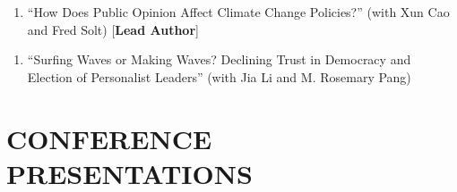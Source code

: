 \documentclass[10.5pt,]{article}
\providecommand{\tightlist}{%
	\setlength{\itemsep}{0pt}\setlength{\parskip}{0pt}}
\renewenvironment{itemize}{
	\begin{list}{}{
			\setlength{\leftmargin}{1.5em}
		}
	}{
	\end{list}
}
\begin{document}
\begin{itemize}
  \begin{itemize}
  \tightlist
  \item
    \begin{enumerate}
    \def\labelenumi{\arabic{enumi}.}
    \setcounter{enumi}{1}
    \tightlist
    \item
      ``How Does Public Opinion Affect Climate Change Policies?'' (with
      Xun Cao and Fred Solt) {[}\textbf{Lead Author}{]}
    \end{enumerate}
  \item
    \begin{enumerate}
    \def\labelenumi{\arabic{enumi}.}
    \tightlist
    \item
      ``Surfing Waves or Making Waves? Declining Trust in Democracy and
      Election of Personalist Leaders'' (with Jia Li and M. Rosemary
      Pang)
    \end{enumerate}
  \end{itemize}
\end{itemize}

\section{CONFERENCE PRESENTATIONS}\label{conference-presentations}
\end{document}
